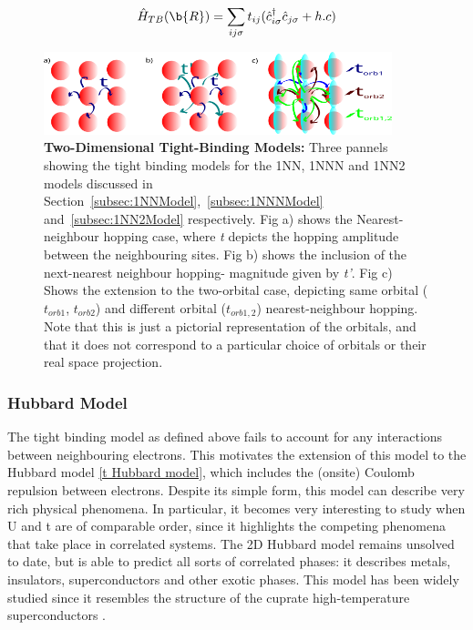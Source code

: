 \documentclass[12pt]{article}
\begin{document}
\begin{equation} \label{TBM}
    \hat{H}_{TB}(\b{R}) = \sum_{ij\sigma} t_{ij}(\hat{c}_{i\sigma}^{\dagger}\hat{c}_{j \sigma} + h.c)
\end{equation}


\begin{figure}[htbp]  %
    \centering
    \includegraphics[width=0.9\textwidth]{2Dhubbardmodel.png}  %
    \caption{\textbf{Two-Dimensional Tight-Binding Models:} Three pannels showing the tight binding models for the 1NN, 1NNN and 1NN2 models discussed in Section~\ref{subsec:1NNModel},~\ref{subsec:1NNNModel} and~\ref{subsec:1NN2Model} respectively. Fig a) shows the Nearest-neighbour hopping case, where \textit{t} depicts the hopping amplitude between the neighbouring sites. Fig b) shows the inclusion of the next-nearest neighbour hopping- magnitude given by \textit{t'}.
    Fig c) Shows the extension to the two-orbital case, depicting  same orbital ($t_{orb1}$, $t_{orb2}$) and different orbital ($t_{orb1,2}$) nearest-neighbour hopping. Note that this is just a pictorial representation of the orbitals, and that it does not correspond to a particular choice of orbitals or their real space projection. }
    \label{fig:2D Hubbard model}
\end{figure}

\newpage

\subsubsection{Hubbard Model}
\label{subsec: HubbardModel}

The  tight binding model as defined above fails to account for any interactions between neighbouring electrons. This motivates the extension of this model to the Hubbard model \eqref{t Hubbard model}, which includes the (onsite) Coulomb repulsion between electrons. Despite its simple form, this model can describe very rich physical phenomena.
In particular, it becomes very interesting to study when U and t are of comparable order, since it highlights the competing phenomena that take place in correlated systems. 
The 2D Hubbard model remains unsolved to date, but is able to predict all sorts of correlated phases: it describes metals, insulators, superconductors and other exotic phases\cite{white1989numerical,hirsch1985two, anderson1990luttinger,sun2011nearly}. 
This model has been widely studied since it resembles the structure of the cuprate high-temperature superconductors \cite{dagotto1994correlated}. 
\end{document}
